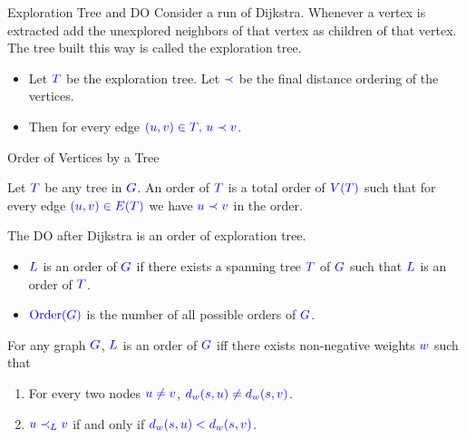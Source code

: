 \documentclass[10pt, handout]{beamer}
\DeclareMathOperator{\order}{Order}
\begin{document}
\begin{frame}{Exploration Tree and DO}
	Consider a run of Dijkstra. Whenever a vertex is extracted add the unexplored neighbors of that vertex as children of that vertex. The tree built this way is called the exploration tree.\pause \vfill

	\begin{itemize}
		\item Let $\mathcolor{blue}{T}$ be the exploration tree. Let $\mathcolor{blue}{\prec}$ be the final distance ordering of the vertices.\pause \vfill
		\item Then for every edge $\mathcolor{blue}{(u,v)\in T$, $u\prec v}$.
	\end{itemize}
\end{frame}
\begin{frame}{Order of Vertices by a Tree}
	\begin{definition}[Order of $T$]
		Let $\mathcolor{blue}{T}$ be any tree in $\mathcolor{blue}{G}$. An order of $\mathcolor{blue}{T}$ is a total order of $\mathcolor{blue}{V(T)}$ such that for every edge $\mathcolor{blue}{(u,v)\in E(T)}$ we have $\mathcolor{blue}{u\prec v}$ in the order.
	\end{definition}\pause\vfill
	The DO after Dijkstra is an order of exploration tree.
	\begin{itemize}
		\item $\mathcolor{blue}{L}$ is an order of $\mathcolor{blue}{G}$ if there exists a spanning tree $\mathcolor{blue}{T}$ of $\mathcolor{blue}{G}$ such that $\mathcolor{blue}{L}$ is an order of $\mathcolor{blue}{T}$.\pause
		\item $\mathcolor{blue}{\order(G)}$ is the number of all possible orders of $\mathcolor{blue}{G}$.
	\end{itemize}\pause \vfill

	\begin{lemma}
		For any graph $\mathcolor{blue}{G}$, $\mathcolor{blue}{L}$ is an order of $\mathcolor{blue}{G}$ iff there exists non-negative weights $\mathcolor{blue}{w}$ such that \begin{enumerate}
			\item For every two nodes $\mathcolor{blue}{u\neq v}$, $\mathcolor{blue}{d_w(s,u)\neq d_w(s,v)}$.
			\item $\mathcolor{blue}{u\prec_L v}$ if and only if $\mathcolor{blue}{d_w(s,u)<d_w(s, v)}$.
		\end{enumerate}
	\end{lemma}
\end{frame}
\end{document}
